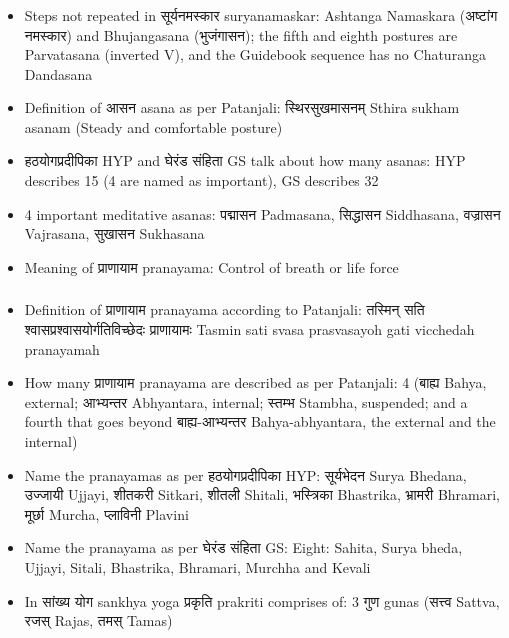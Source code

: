 \begin{frame}[fragile]\frametitle{}
\begin{itemize}
\item Steps not repeated in सूर्यनमस्कार suryanamaskar: Ashtanga Namaskara (अष्टांग नमस्कार) and Bhujangasana (भुजंगासन); the fifth and eighth postures are Parvatasana (inverted V), and the Guidebook sequence has no Chaturanga Dandasana
\item Definition of आसन asana as per Patanjali: स्थिरसुखमासनम् Sthira sukham asanam (Steady and comfortable posture)
\item हठयोगप्रदीपिका HYP and घेरंड संहिता GS talk about how many asanas: HYP describes 15 (4 are named as important), GS describes 32
\item 4 important meditative asanas: पद्मासन Padmasana, सिद्धासन Siddhasana, वज्रासन Vajrasana, सुखासन Sukhasana
\item Meaning of प्राणायाम pranayama: Control of breath or life force
\end{itemize}
\end{frame}

\begin{frame}[fragile]\frametitle{}
\begin{itemize}
\item Definition of प्राणायाम pranayama according to Patanjali: तस्मिन् सति श्वासप्रश्वासयोर्गतिविच्छेदः प्राणायामः Tasmin sati svasa prasvasayoh gati vicchedah pranayamah
\item How many प्राणायाम pranayama are described as per Patanjali: 4 (बाह्य Bahya, external; आभ्यन्तर Abhyantara, internal; स्तम्भ Stambha, suspended; and a fourth that goes beyond बाह्य-आभ्यन्तर Bahya-abhyantara, the external and the internal)
\item Name the pranayamas as per हठयोगप्रदीपिका HYP: सूर्यभेदन Surya Bhedana, उज्जायी Ujjayi, शीतकरी Sitkari, शीतली Shitali, भस्त्रिका Bhastrika, भ्रामरी Bhramari, मूर्छा Murcha, प्लाविनी Plavini
\item Name the pranayama as per घेरंड संहिता GS: Eight: Sahita, Surya bheda, Ujjayi, Sitali, Bhastrika, Bhramari, Murchha and Kevali
\item In सांख्य योग sankhya yoga प्रकृति prakriti comprises of: 3 गुण gunas (सत्त्व Sattva, रजस् Rajas, तमस् Tamas)
\end{itemize}
\end{frame}

